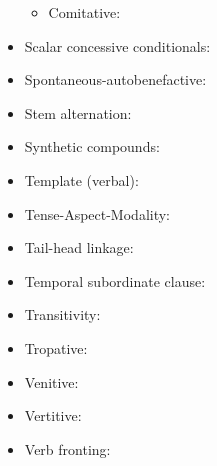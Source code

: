 \documentclass[oldfontcommands,oneside,a4paper,11pt]{article}
\begin{document}
\begin{itemize}
\begin{itemize}
\item Comitative: \citet[272-4]{jacques14linking}
\end{itemize}
\item Scalar concessive conditionals: \citet[300]{jacques14linking}
\item Spontaneous-autobenefactive: \citet{jacques15spontaneous}
\item Stem alternation:  \citet[267]{jacques14linking}
\item Synthetic compounds: \citet[1220-3]{jacques12incorp}
\item Template (verbal): \citet[196-199]{jacques13harmonization}
\item Tense-Aspect-Modality:  \citet[265-9]{jacques14linking}
\item Tail-head linkage:  \citet[279-280]{jacques14linking}
\item Temporal subordinate clause:  \citet[281-295]{jacques14linking}
\item Transitivity: \citet[9-10]{jacques14antipassive}
\item Tropative: \citet{jacques13tropative}
\item Venitive: \citet[200-6]{jacques13harmonization}
\item Vertitive:  \citet{jacques15spontaneous}
\item Verb fronting:  \citet[280]{jacques14linking}
\end{itemize}



\end{document}
